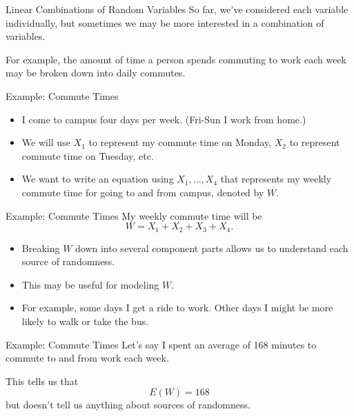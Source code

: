 \begin{frame}{Linear Combinations of Random Variables}
    So far, we've considered each variable individually, but sometimes we may be more interested in a combination of variables. 
    
    \vspace{12pt}For example, the amount of time a person spends commuting to work each week may be broken down into daily commutes.
\end{frame}

\begin{frame}{Example: Commute Times}
    \begin{itemize}
        \item I come to campus four days per week. (Fri-Sun I work from home.)
        \item We will use $X_1$ to represent my commute time on Monday, $X_2$ to represent commute time on Tuesday, etc. 
        \item We want to write an equation using $X_1, ..., X_4$ that represents my weekly commute time for going to and from campus, denoted by $W$.
    \end{itemize}
\end{frame}

\begin{frame}{Example: Commute Times}
    My weekly commute time will be
    \[
    W = X_1 + X_2 + X_3 + X_4.
    \]
    \begin{itemize}
        \item Breaking $W$ down into several component parts allows us to understand each source of randomness. 
        \item This may be useful for modeling $W$.
        \item For example, some days I get a ride to work. Other days I might be more likely to walk or take the bus.
    \end{itemize}
\end{frame}

\begin{frame}{Example: Commute Times}
    Let's say I spent an average of 168 minutes to commute to and from work each week. 
    
    \vspace{12pt}This tells us that
    \[
    E(W) = 168
    \]
    but doesn't tell us anything about sources of randomness.
\end{frame}

